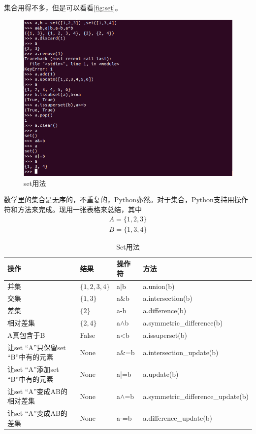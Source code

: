 \documentclass[11pt,UTF8,oneside]{mybook}
\begin{document}
集合用得不多，但是可以看看\autoref{fig:set}。

\begin{figure}[htb]
  \centering \includegraphics[width=\textwidth]{./figure/set.png}
  \caption{set用法}
  \label{fig:set}
\end{figure}

数学里的集合是无序的，不重复的，Python亦然。对于集合，Python支持用操作
符和方法来完成。现用一张表格来总结，其中
\begin{align*}
  A=\{1,2,3\}\\
  B=\{1,3,4\}
\end{align*}


\begin{table}[htb]
  \centering
  \caption{Set用法}
  \begin{tabular}[htb]{|p{5cm}|l|l|l|}
    \hline
    操作&结果&操作符&方法\\
    \hline
    并集& $\{1,2,3,4\}$&a|b & a.union(b)\\
    \hline
    交集& $\{1,3\}$&a\&b & a.intersection(b) \\
    \hline
    差集& $\{2\}$&a-b & a.difference(b) \\
    \hline
    相对差集& $\{2,4\}$& a$\land$b & a.symmetric\_difference(b) \\
    \hline
    A真包含于B& False &a<b & a.issuperset(b) \\
    \hline
    让set “A”只保留set “B”中有的元素&None &a\&=b & a.intersection\_update(b) \\
    \hline
    让set “A”添加set “B”中有的元素&None &a|=b & a.update(b) \\
    \hline
    让set “A”变成AB的相对差集&None &a$\land$=b & a.symmetric\_difference\_update(b) \\
    \hline
    让set “A”变成AB的差集&None &a-=b & a.difference\_update(b) \\
    \hline
  \end{tabular}

  \label{tab:usage_of_set}
\end{table}
\end{document}
